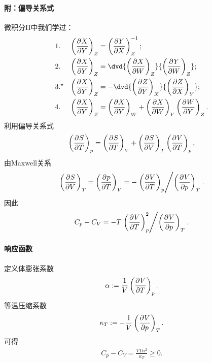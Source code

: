 \paragraph{附：偏导关系式}
微积分II中我们学过：
\begin{align}
	 & 1.       & \kh{\pv XY}_Z & =\kh{\pv YX}_Z^{-1};                                             \\
	 & 2.       & \kh{\pv XY}_Z & =\dvd{\kh{\pv XW}_Z}{\kh{\pv YW}_Z};  \\
	 & 3.^\star & \kh{\pv XY}_Z & =-\dvd{\kh{\pv ZY}_X}{\kh{\pv ZX}_Y}; \\
	 & 4.       & \kh{\pv XY}_Z & =\kh{\pv XY}_W+\kh{\pv XW}_Y\kh{\pv WY}_Z.
\end{align}
\fi
利用偏导关系式
\begin{align*}
	\kh{\pv ST}_p=\kh{\pv ST}_V+\kh{\pv SV}_T\kh{\pv VT}_p,
\end{align*}
由Maxwell关系
\[
	\kh{\pv SV}_T=\kh{\pv pT}_V=-\division{\kh{\pv VT}_p}{\kh{\pv Vp}_T}.
\]
因此
\[
	C_p-C_V=-T\division{\kh{\pv VT}_p^2}{\kh{\pv Vp}_T}.
\]

\paragraph{响应函数}定义体膨张系数
\begin{align}
	\alpha:=\frac1V\kh{\pv VT}_p.
\end{align}
等温压缩系数
\begin{align}
	\kappa_T:=-\frac1V\kh{\pv Vp}_T.
\end{align}
可得
\begin{align}
	C_p-C_V=\frac{VT\alpha^2}{\kappa_T}\geqslant 0.
\end{align}